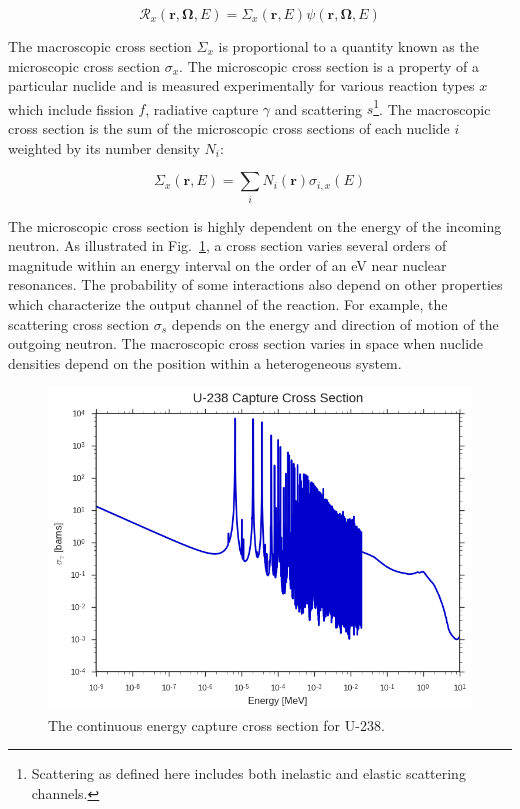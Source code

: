 \begin{dmath}
\label{eqn:chap2-rxn-rates}
\mathcal{R}_{x}(\mathbf{r},\mathbf{\Omega},E) = \Sigma_{x}(\mathbf{r},E) \psi(\mathbf{r},\mathbf{\Omega},E)
\end{dmath}

\noindent The macroscopic cross section $\Sigma_{x}$ is proportional to a quantity known as the microscopic cross section $\sigma_{x}$. The microscopic cross section is a property of a particular nuclide and is measured experimentally for various reaction types $x$ which include fission $f$, radiative capture $\gamma$ and scattering $s$\footnote{Scattering as defined here includes both inelastic and elastic scattering channels.}. The macroscopic cross section is the sum of the microscopic cross sections of each nuclide $i$ weighted by its number density $N_{i}$:

\begin{dmath}
\label{eqn:chap2-macro-xs-sum}
\Sigma_{x}(\mathbf{r},E) = \sum_{i}N_{i}(\mathbf{r})\sigma_{i,x}(E)
\end{dmath}

The microscopic cross section is highly dependent on the energy of the incoming neutron. As illustrated in Fig.~\ref{fig:chap2-u238-xs}, a cross section varies several orders of magnitude within an energy interval on the order of an eV near nuclear resonances. The probability of some interactions also depend on other properties which characterize the output channel of the reaction. For example, the scattering cross section $\sigma_{s}$ depends on the energy and direction of motion of the outgoing neutron. The macroscopic cross section varies in space when nuclide densities depend on the position within a heterogeneous system.

\begin{figure}[H]
  \centering
  \includegraphics[width=0.8\linewidth]{figures/mgxs/u238-capture-xs}
\caption[U-238 capture cross section]{The continuous energy capture cross section for U-238.}
\label{fig:chap2-u238-xs}
\end{figure}
 
